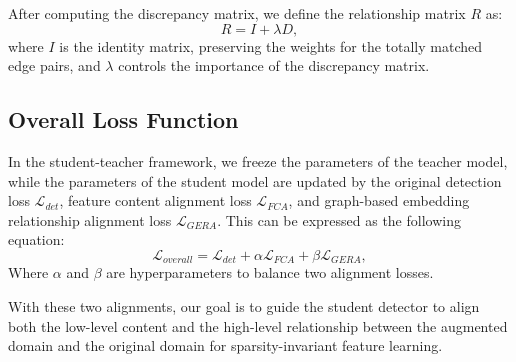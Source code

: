 After computing the discrepancy matrix, we define the relationship matrix $R$ as:
\begin{equation}
    R = I + \lambda D,
\end{equation}
where $I$ is the identity matrix, preserving the weights for the totally matched edge pairs, and  $\lambda$ controls the importance of the discrepancy matrix.

\subsection{Overall Loss Function}
In the student-teacher framework, we freeze the parameters of the teacher model, while the parameters of the student model are updated by the original detection loss $\mathcal{L}_{det}$, feature content alignment loss $\mathcal{L}_{FCA}$, and graph-based embedding relationship alignment loss $\mathcal{L}_{GERA}$. This can be expressed as the following equation:
\begin{equation}
\mathcal{L}_{overall} = \mathcal{L}_{det} + \alpha \mathcal{L}_{FCA} + \beta \mathcal{L}_{GERA},
\end{equation}
Where $\alpha$ and $\beta$ are hyperparameters to balance two alignment losses. 

With these two alignments, our goal is to guide the student detector to align both the low-level content and the high-level relationship between the augmented domain and the original domain for sparsity-invariant feature learning.